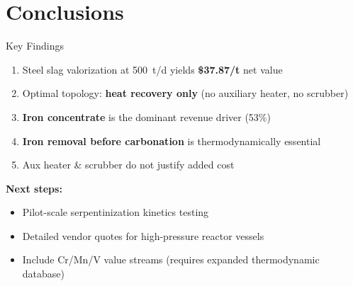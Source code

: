 \documentclass[aspectratio=169]{beamer}
\begin{document}
\section{Conclusions}

\begin{frame}{Key Findings}
\begin{enumerate}
    \item Steel slag valorization at \SI{500}{t/d} yields \textcolor{StepGreen}{\textbf{\$37.87/t}} net value
    \item Optimal topology: \textbf{heat recovery only} (no auxiliary heater, no scrubber)
    \item \textbf{Iron concentrate} is the dominant revenue driver (53\%)
    \item \textbf{Iron removal before carbonation} is thermodynamically essential
    \item Aux heater \& scrubber do not justify added cost
\end{enumerate}
\vspace{12pt}
\textbf{Next steps:}
\begin{itemize}
    \item Pilot-scale serpentinization kinetics testing
    \item Detailed vendor quotes for high-pressure reactor vessels
    \item Include Cr/Mn/V value streams (requires expanded thermodynamic database)
\end{itemize}
\end{frame}

\closingSlide
\end{document}
